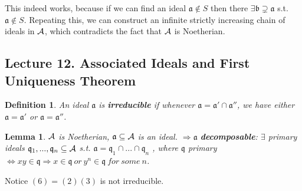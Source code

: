 \documentclass[11pt]{article}
\newtheorem{lemma}[thm]{Lemma}
\newtheorem{dfn}[thm]{Definition}
\newcommand{\sca}{{\mathfrak a}}
\newcommand{\scb}{{\mathfrak b}}
\newcommand{\scq}{\mathfrak q}
\newcommand{\cala}{{\cal A}}
\newcommand{\Lrta}{\Longrightarrow}
\newcommand{\Llrta}{\Longleftrightarrow}
\begin{document}
 This indeed works, because if we can find an ideal $\sca\notin S$ then there $\exists \scb\supsetneq \sca$ s.t. $\sca\notin S$. Repeating this, we can construct an infinite strictly increasing chain of ideals in $\cala$, which contradicts the fact that $\cala$ is Noetherian. 
\subsection{Lecture 12. Associated Ideals and First Uniqueness Theorem}
\begin{dfn}
An ideal $\sca$ is \textbf{irreducible} if whenever $\sca=\sca'\cap \sca''$, we have either $\sca=\sca'$ or $\sca=\sca''$.
\end{dfn}
\begin{lemma}
$\cala$ is Noetherian, $\sca\subseteq \cala$ is an ideal. $\Lrta\sca$ \textbf{decomposable}:
$\exists $ primary ideals $\scq_1,...,\scq_n\subseteq \cala$ s.t. $\sca=\scq_1\cap...\cap\scq_n$
, where $\scq$ primary $\Llrta x y\in \scq\Lrta x\in \scq\ or\ y^n\in \scq\ for\ some \ n$.
\end{lemma}
Notice $(6)=(2)(3)$ is not irreducible.
\end{document}

